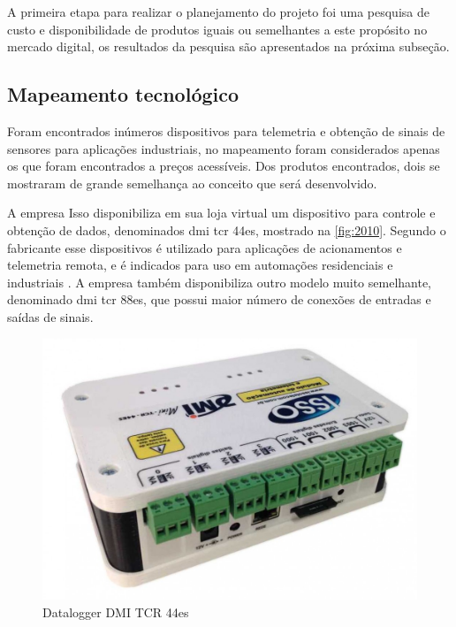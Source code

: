 A primeira etapa para realizar o planejamento do projeto foi uma pesquisa de custo e disponibilidade de produtos iguais ou semelhantes a este propósito no mercado digital,
os resultados da pesquisa são apresentados na próxima subseção.

\subsection{Mapeamento tecnológico}

Foram encontrados inúmeros dispositivos para telemetria e obtenção de sinais de sensores para aplicações industriais, no mapeamento foram considerados apenas os que foram
encontrados a preços acessíveis.
Dos produtos encontrados, dois se mostraram de grande semelhança ao conceito que será desenvolvido.

A empresa Isso disponibiliza em sua loja virtual um dispositivo para controle e obtenção de dados, denominados dmi tcr 44es, mostrado na \autoref{fig:2010}.
Segundo o fabricante esse dispositivos é utilizado para aplicações de acionamentos e telemetria remota, e é indicados para uso em automações residenciais e
industriais \autocite{Isso44es}.
A empresa também disponibiliza outro modelo muito semelhante, denominado dmi tcr 88es, que possui maior número de conexões de entradas e saídas de sinais.

\begin{figure}[htb]
	\caption{\label{fig:2010} Datalogger DMI TCR 44es}
	\begin{center}
		\includegraphics[width=\textwidth]{pictures/2010.jpg}
	\end{center}
\end{figure}

